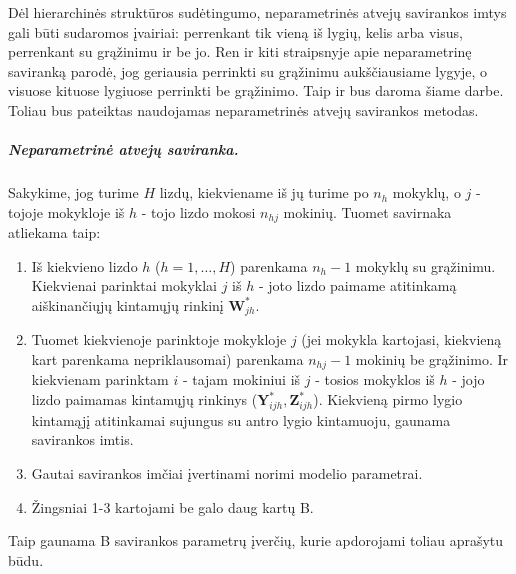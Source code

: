 \documentclass[12pt,a4paper]{article}
\begin{document}
\indent Dėl hierarchinės struktūros sudėtingumo, neparametrinės atvejų savirankos imtys gali būti sudaromos įvairiai: perrenkant tik vieną iš lygių, kelis arba visus, perrenkant su grąžinimu ir be jo. Ren ir kiti \cite{bootNest} straipsnyje apie neparametrinę saviranką parodė, jog geriausia perrinkti su grąžinimu aukščiausiame lygyje, o visuose kituose lygiuose perrinkti be grąžinimo. Taip ir bus daroma šiame darbe. Toliau bus pateiktas naudojamas neparametrinės atvejų savirankos metodas.

\subparagraph{Neparametrinė atvejų saviranka.} Sakykime, jog turime $H$ lizdų, kiekviename iš jų turime po $n_h$ mokyklų, o $j$ - tojoje mokykloje iš $h$ - tojo lizdo mokosi $n_{hj}$ mokinių. Tuomet savirnaka atliekama taip:
\begin{enumerate}
\item Iš kiekvieno lizdo $h$ ($h=1,\dots,H$) parenkama $n_h-1$ mokyklų su grąžinimu. Kiekvienai parinktai mokyklai $j$ iš $h$ - joto lizdo paimame atitinkamą aiškinančiųjų kintamųjų rinkinį $\mathbf{W}^*_{jh}$.
\item Tuomet kiekvienoje parinktoje mokykloje $j$ (jei mokykla kartojasi, kiekvieną kart parenkama nepriklausomai) parenkama $n_{hj}-1$ mokinių be grąžinimo. Ir kiekvienam parinktam $i$ - tajam mokiniui iš $j$ - tosios mokyklos iš $h$ - jojo lizdo paimamas kintamųjų rinkinys ($\mathbf{Y}^*_{ijh}, \mathbf{Z}^*_{ijh}$). Kiekvieną pirmo lygio kintamąjį atitinkamai sujungus su antro lygio kintamuoju, gaunama savirankos imtis.
\item Gautai savirankos imčiai įvertinami norimi modelio parametrai.
\item Žingsniai 1-3 kartojami be galo daug kartų B.
\end{enumerate}
Taip gaunama B savirankos parametrų įverčių, kurie apdorojami toliau aprašytu būdu.
\end{document}
